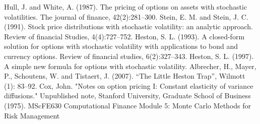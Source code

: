 \documentclass[11pt]{article}
\begin{document}
\begin{thebibliography}{MMMMM} 
 Hull, J. and White, A. (1987). The pricing of options on assets
with stochastic volatilities. The journal of finance, 42(2):281--300.
 Stein, E. M. and Stein, J. C. (1991). Stock price distributions
with stochastic volatility: an analytic approach. Review of financial
Studies, 4(4):727--752.
 Heston, S. L. (1993). A closed-form solution for options with
stochastic volatility with applications to bond and currency options.
Review of financial studies, 6(2):327--343.
 Heston, S. L. (1997). A simple new formula for options with
stochastic volatility.
 Albrecher, H., Mayer, P., Schoutens, W. and Tistaert, J. (2007).
``The Little Heston Trap'', Wilmott (1): 83--92.
  Cox, John. "Notes on option pricing I: Constant elasticity of variance diffusions." Unpublished note, Stanford University, Graduate School of Business (1975).
 MScFE630 Computational Finance Module 5: Monte Carlo Methods for Risk Management

\end{thebibliography}
\end{document}
